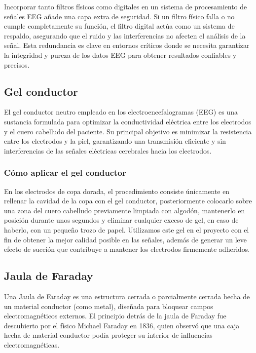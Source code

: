 \documentclass{article}
\begin{document}
\begin{enumerate}
    Incorporar tanto filtros físicos como digitales en un sistema de procesamiento de señales EEG añade una capa extra de seguridad. Si un filtro físico falla o no cumple completamente su función, el filtro digital actúa como un sistema de respaldo, asegurando que el ruido y las interferencias no afecten el análisis de la señal. Esta redundancia es clave en entornos críticos donde se necesita garantizar la integridad y pureza de los datos EEG para obtener resultados confiables y precisos.
\end{enumerate}

\subsection{Gel conductor}
El gel conductor neutro empleado en los electroencefalogramas (EEG) es una sustancia formulada para optimizar la conductividad eléctrica entre los electrodos y el cuero cabelludo del paciente. Su principal objetivo es minimizar la resistencia entre los electrodos y la piel, garantizando una transmisión eficiente y sin interferencias de las señales eléctricas cerebrales hacia los electrodos. 

\subsubsection{Cómo aplicar el gel conductor}
En los electrodos de copa dorada, el procedimiento consiste únicamente en rellenar la cavidad de la copa con el gel conductor, posteriormente colocarlo sobre una zona del cuero cabelludo previamente limpiada con algodón, mantenerlo en posición durante unos segundos y eliminar cualquier exceso de gel, en caso de haberlo, con un pequeño trozo de papel. Utilizamos este gel en el proyecto con el fin de obtener la mejor calidad posible en las señales, además de generar un leve efecto de succión que contribuye a mantener los electrodos firmemente adheridos.

\subsection{Jaula de Faraday}
Una Jaula de Faraday es una estructura cerrada o parcialmente cerrada hecha de un material conductor (como metal), diseñada para bloquear campos electromagnéticos externos. El principio detrás de la jaula de Faraday fue descubierto por el físico Michael Faraday en 1836, quien observó que una caja hecha de material conductor podía proteger su interior de influencias electromagnéticas.
\end{document}
